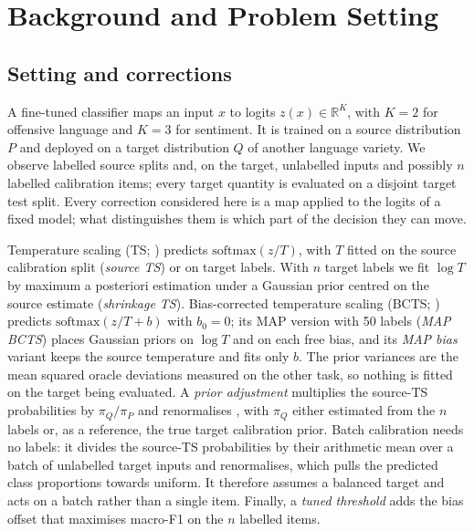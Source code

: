 \section{Background and Problem Setting}
\label{sec:background}

\subsection{Setting and corrections}
\label{sec:background-corrections}

A fine-tuned classifier maps an input $x$ to logits $z(x) \in \mathbb{R}^K$, with $K = 2$ for offensive language and
$K = 3$ for sentiment. It is trained on a source distribution $P$ and deployed on a target distribution $Q$ of another
language variety. We observe labelled source splits and, on the target, unlabelled inputs and possibly $n$ labelled
calibration items; every target quantity is evaluated on a disjoint target test split. Every correction considered here is a
map applied to the logits of a fixed model; what distinguishes them is which part of the decision they can move.

Temperature scaling (TS; \citealp{guo2017calibration}) predicts $\mathrm{softmax}(z/T)$, with $T$ fitted on the source
calibration split (\emph{source TS}) or on target labels. With $n$ target labels we fit $\log T$ by maximum a
posteriori estimation under a Gaussian prior centred on the source estimate (\emph{shrinkage TS}). Bias-corrected
temperature scaling (BCTS; \citealp{alexandari2020maximum}) predicts $\mathrm{softmax}(z/T + b)$ with $b_0 = 0$; its MAP
version with 50 labels (\emph{MAP BCTS}) places Gaussian priors on $\log T$ and on each free bias, and its
\emph{MAP bias} variant keeps the source temperature and fits only $b$. The prior variances are the mean squared
oracle deviations measured on the other task, so nothing is fitted on the target being evaluated. A
\emph{prior adjustment} multiplies the source-TS probabilities by $\pi_Q / \pi_P$ and renormalises
\citep{saerens2002adjusting}, with $\pi_Q$ either estimated from the $n$ labels or, as a reference, the true target
calibration prior. Batch calibration \citep{zhou2024batch} needs no labels: it divides the source-TS probabilities by
their arithmetic mean over a batch of unlabelled target inputs and renormalises, which pulls the predicted class
proportions towards uniform. It therefore assumes a balanced target and acts on a batch rather than a single item.
Finally, a \emph{tuned threshold} adds the bias offset that maximises macro-F1 on the $n$ labelled items.

